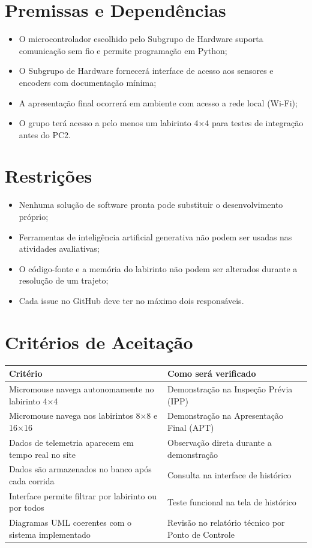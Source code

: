 \documentclass[a4paper,12pt]{article}
\begin{document}
\section{Premissas e Dependências}

\begin{itemize}
    \item O microcontrolador escolhido pelo Subgrupo de Hardware suporta comunicação sem fio e permite programação em Python;
    \item O Subgrupo de Hardware fornecerá interface de acesso aos sensores e encoders com documentação mínima;
    \item A apresentação final ocorrerá em ambiente com acesso a rede local (Wi-Fi);
    \item O grupo terá acesso a pelo menos um labirinto 4×4 para testes de integração antes do PC2.
\end{itemize}

\section{Restrições}

\begin{itemize}
    \item Nenhuma solução de software pronta pode substituir o desenvolvimento próprio;
    \item Ferramentas de inteligência artificial generativa não podem ser usadas nas atividades avaliativas;
    \item O código-fonte e a memória do labirinto não podem ser alterados durante a resolução de um trajeto;
    \item Cada issue no GitHub deve ter no máximo dois responsáveis.
\end{itemize}

\section{Critérios de Aceitação}

\begin{longtable}{|p{7cm}|p{6cm}|}
\hline
\textbf{Critério} & \textbf{Como será verificado} \\
\hline
Micromouse navega autonomamente no labirinto 4×4 & Demonstração na Inspeção Prévia (IPP) \\
\hline
Micromouse navega nos labirintos 8×8 e 16×16 & Demonstração na Apresentação Final (APT) \\
\hline
Dados de telemetria aparecem em tempo real no site & Observação direta durante a demonstração \\
\hline
Dados são armazenados no banco após cada corrida & Consulta na interface de histórico \\
\hline
Interface permite filtrar por labirinto ou por todos & Teste funcional na tela de histórico \\
\hline
Diagramas UML coerentes com o sistema implementado & Revisão no relatório técnico por Ponto de Controle \\
\hline
\end{longtable}
\end{document}
